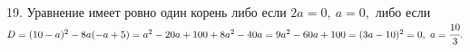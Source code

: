 19. Уравнение имеет ровно один корень либо если $2a=0,\ a=0,$ либо если $D=(10-a)^2-8a(-a+5)=a^2-20a+100+8a^2-40a=9a^2-60a+100=(3a-10)^2=0,\ a=\cfrac{10}{3}.$\\
